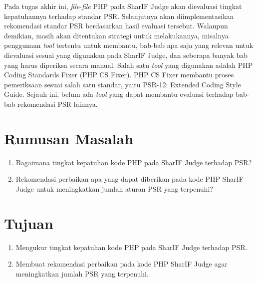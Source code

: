 \documentclass[a4paper,twoside]{article}
\begin{document}
	Pada tugas akhir ini, \textit{file}-\textit{file} PHP pada SharIF Judge akan dievaluasi tingkat kepatuhannya terhadap standar PSR. Selanjutnya akan diimplementasikan rekomendasi standar PSR berdasarkan hasil evaluasi tersebut. Walaupun demikian, masih akan ditentukan strategi untuk melakukannya, misalnya penggunaan \textit{tool} tertentu untuk membantu, bab-bab apa saja yang relevan untuk dievaluasi sesuai yang digunakan pada SharIF Judge, dan seberapa banyak bab yang harus diperiksa secara manual. Salah satu \textit{tool} yang digunakan adalah PHP Coding Standards Fixer (PHP CS Fixer). PHP CS Fixer membantu proses pemeriksaan sesuai salah satu standar, yaitu PSR-12: Extended Coding Style Guide. Sejauh ini, belum ada \textit{tool} yang dapat membantu evaluasi terhadap bab-bab rekomendasi PSR lainnya.
	
	\section{Rumusan Masalah}
	\begin{enumerate}
		\item Bagaimana tingkat kepatuhan kode PHP pada SharIF Judge terhadap PSR?  
		\item Rekomendasi perbaikan apa yang dapat diberikan pada kode PHP SharIF Judge untuk meningkatkan jumlah aturan PSR yang terpenuhi?
	\end{enumerate}
	
	\section{Tujuan}
	\begin{enumerate}
		\item Mengukur tingkat kepatuhan kode PHP pada SharIF Judge terhadap PSR.
		\item Membuat rekomendasi perbaikan pada kode PHP SharIF Judge agar meningkatkan jumlah PSR yang terpenuhi. 
	\end{enumerate}
	
\end{document}
